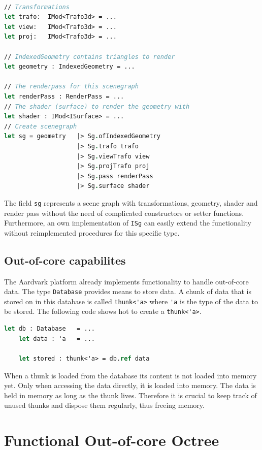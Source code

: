 \begin{lstlisting}[language = FSharp]

// Transformations
let trafo:	IMod<Trafo3d> = ... 
let view:	IMod<Trafo3d> = ...
let proj:	IMod<Trafo3d> = ...

// IndexedGeometry contains triangles to render
let geometry : IndexedGeometry = ...

// The renderpass for this scenegraph
let renderPass : RenderPass = ...
// The shader (surface) to render the geometry with
let shader : IMod<ISurface> = ...
// Create scenegraph
let sg = geometry	|> Sg.ofIndexedGeometry
                    |> Sg.trafo trafo
                    |> Sg.viewTrafo view
                    |> Sg.projTrafo proj
                    |> Sg.pass renderPass
                    |> Sg.surface shader
\end{lstlisting}

The field \verb|sg| represents a scene graph with transformations, geometry, shader and render pass without the need of complicated constructors or setter functions. Furthermore, an own implementation of \verb|ISg| can easily extend the functionality without reimplemented procedures for this specific type. 


\subsection{Out-of-core capabilites}
The Aardvark platform already implements functionality to handle out-of-core data. The type \verb|Database| provides means to store data. A chunk of data that is stored on in this database is called \verb|thunk<'a>| where \verb|'a| is the type of the data to be stored. The following code shows hot to create a \verb|thunk<'a>|. 

\begin{lstlisting}[language = FSharp]
	let db : Database	= ...
	let data : 'a 	= ...
	
	let stored : thunk<'a> = db.ref data
\end{lstlisting}
When a thunk is loaded from the database its content is not loaded into memory yet. Only when accessing the data directly, it is loaded into memory. The data is held in memory as long as the thunk lives. Therefore it is crucial to keep track of unused thunks and dispose them regularly, thus freeing memory. 


\section{Functional Out-of-core Octree}
\label{sec:funcOctree}

